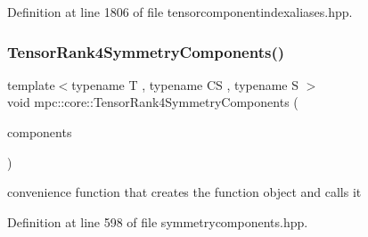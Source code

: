 Definition at line 1806 of file tensorcomponentindexaliases.\+hpp.

\mbox{\label{namespacempc_1_1core_a1b8ea597fa8c5cacc9f51dc5bcf18809}} 
\subsubsection{\texorpdfstring{Tensor\+Rank4\+Symmetry\+Components()}{TensorRank4SymmetryComponents()}}
{\footnotesize\ttfamily template$<$typename T , typename CS , typename S $>$ \\
void mpc\+::core\+::\+Tensor\+Rank4\+Symmetry\+Components (\begin{DoxyParamCaption}\item[{std\+::set$<$ \mbox{\hyperlink{classmpc_1_1core_1_1_tensor_rank_n_component}{mpc\+::core\+::\+Tensor\+Rank\+N\+Component}}$<$ T, 4 $>$ $>$ \&}]{components }\end{DoxyParamCaption})}



convenience function that creates the function object and calls it 



Definition at line 598 of file symmetrycomponents.\+hpp.

